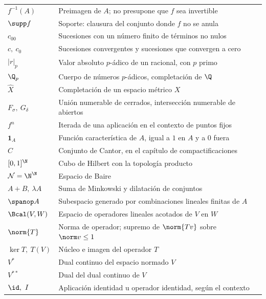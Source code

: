 \begin{longtable}{@{}p{}p{}r@{}}
$f^{-1}(A)$ & Preimagen de $A$; no presupone que $f$ sea invertible & \pageref{chap:05}\\
$\supp f$ & Soporte: clausura del conjunto donde $f$ no se anula & \pageref{chap:05}\\
$c_{00}$ & Sucesiones con un número finito de términos no nulos & \pageref{chap:06}\\
$c,\ c_0$ & Sucesiones convergentes y sucesiones que convergen a cero & \pageref{chap:08}\\
$|r|_p$ & Valor absoluto $p$-ádico de un racional, con $p$ primo & \pageref{chap:08}\\
$\Q_p$ & Cuerpo de números $p$-ádicos, completación de $\Q$ & \pageref{chap:09}\\
$\widehat X$ & Completación de un espacio métrico $X$ & \pageref{chap:09}\\
$F_\sigma,\ G_\delta$ & Unión numerable de cerrados, intersección numerable de abiertos & \pageref{chap:10}\\
$f^n$ & Iterada de una aplicación en el contexto de puntos fijos & \pageref{chap:11}\\
$\mathbf1_A$ & Función característica de $A$, igual a $1$ en $A$ y a $0$ fuera & \pageref{chap:10}\\
$C$ & Conjunto de Cantor, en el capítulo de compactificaciones & \pageref{chap:16}\\
$[0,1]^{\N}$ & Cubo de Hilbert con la topología producto & \pageref{chap:16}\\
$\mathcal N=\N^{\N}$ & Espacio de Baire & \pageref{chap:16}\\
$A+B,\ \lambda A$ & Suma de Minkowski y dilatación de conjuntos & \pageref{chap:19}\\
$\spanop A$ & Subespacio generado por combinaciones lineales finitas de $A$ & \pageref{chap:19}\\
$\Bcal(V,W)$ & Espacio de operadores lineales acotados de $V$ en $W$ & \pageref{chap:20}\\
$\norm{T}$ & Norma de operador; supremo de $\norm{Tv}$ sobre $\norm v\le1$ & \pageref{chap:20}\\
$\ker T,\ T(V)$ & Núcleo e imagen del operador $T$ & \pageref{chap:20}\\
$V^*$ & Dual continuo del espacio normado $V$ & \pageref{chap:21}\\
$V^{**}$ & Dual del dual continuo de $V$ & \pageref{chap:21}\\
$\id,\ I$ & Aplicación identidad u operador identidad, según el contexto & \pageref{chap:21}\\

\end{longtable}
